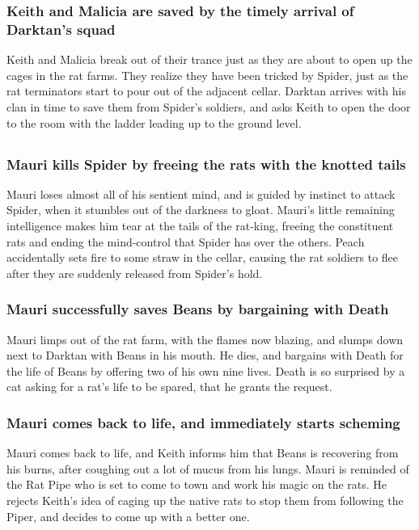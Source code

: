 \subsubsection{\Gls{Keith} and \Gls{Malicia} are saved by the timely arrival of \Gls{Darktan}'s
    squad}
\Gls{Keith} and \Gls{Malicia} break out of their trance just as they are about to open up the cages
in the rat farms. They realize they have been tricked by \Gls{Spider}, just as the rat terminators
start to pour out of the adjacent cellar. \Gls{Darktan} arrives with his clan in time to save them
from \Gls{Spider}'s soldiers, and asks \Gls{Keith} to open the door to the room with the ladder
leading up to the ground level.

\subsection{}
\subsubsection{\Gls{Mauri} kills \Gls{Spider} by freeing the rats with the knotted tails}
\Gls{Mauri} loses almost all of his sentient mind, and is guided by instinct to attack \Gls{Spider},
when it stumbles out of the darkness to gloat. \Gls{Mauri}'s little remaining intelligence makes
him tear at the tails of the rat-king, freeing the constituent rats and ending the mind-control
that \Gls{Spider} has over the others. \Gls{Peach} accidentally sets fire to some straw in the
cellar, causing the rat soldiers to flee after they are suddenly released from \Gls{Spider}'s hold.

\subsubsection{\Gls{Mauri} successfully saves \Gls{Beans} by bargaining with \Gls{Death}}
\Gls{Mauri} limps out of the rat farm, with the flames now blazing, and slumps down next to
\Gls{Darktan} with \Gls{Beans} in his mouth. He dies, and bargains with \Gls{Death} for the life of
\Gls{Beans} by offering two of his own nine lives. \Gls{Death} is so surprised by a cat asking for
a rat's life to be spared, that he grants the request.

\subsubsection{\Gls{Mauri} comes back to life, and immediately starts scheming}
\Gls{Mauri} comes back to life, and \Gls{Keith} informs him that \Gls{Beans} is recovering from his
burns, after coughing out a lot of mucus from his lungs. \Gls{Mauri} is reminded of the Rat Pipe who
is set to come to town and work his magic on the rats. He rejects \Gls{Keith}'s idea of caging up
the native rats to stop them from following the \Gls{Piper}, and decides to come up with a better one.

